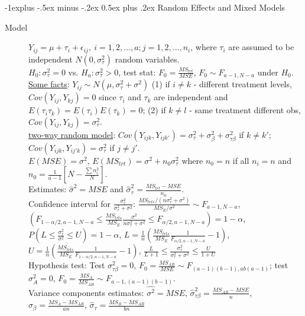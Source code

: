 \documentclass[10pt,landscape]{article}
\makeatletter
\renewcommand{\subsection}{\@startsection{subsection}{2}{0mm}%
                                {-1explus -.5ex minus -.2ex}%
                                {0.5ex plus .2ex}%
                                {\normalfont\normalsize\bfseries}}
\makeatother
\begin{document}
\begin{multicols}{3}
\subsection{Random Effects and Mixed Models}
\begin{description}
\item[Model] $Y_{ij} = \mu + \tau_i + \epsilon_{ij},\ i = 1,2,...,a; j = 1, 2,..., n_i$, where $\tau_i$  are assumed to be independent $N(0, \sigma_{\tau}^2)$ random variables. \\ 
$H_0: \sigma_{\tau}^2 = 0$ vs. $H_a: \sigma_{\tau}^2 > 0$, test stat: $F_0 = \frac{MS_{trt}}{MSE}$, $F_0 \sim F_{a-1,N-a}$ under $H_0$. \\
\underline{Some facts}: $Y_{ij} \sim N(\mu , \sigma_{\tau}^2+\sigma^2)$ (1) if $i\neq k$ - different treatment levels, $Cov(Y_{ij}, Y_{kj}) = 0$ since $\tau_i$ and $\tau_k$ are independent and $E(\tau_i\tau_k) = E(\tau_i)E(\tau_k) = 0$; (2) if $k \neq l$ - same treatment different obs, $Cov(Y_{ij}, Y_{kj}) = \sigma_{\tau}^2$. \\
\underline{two-way random model}: $Cov(Y_{ijk}, Y_{ijk'}) = \sigma_{\tau}^2 + \sigma_{\beta}^2 + \sigma_{\tau \beta}^2$ if $k \neq k'$; $Cov(Y_{ijk}, Y_{ij'k}) = \sigma_{\tau}^2$ if $j \neq j'$. \\
$E(MSE) = \sigma^2$, $E(MS_{trt}) = \sigma^2 + n_0\sigma_{\tau}^2$ where $n_0 = n$ if all $n_i = n$ and $n_0 = \frac{1}{a-1}[N-\frac{\sum n_i^2}{N}]$.\\
Estimates: $\hat{\sigma}^2 = MSE$ and $\hat{\sigma}_{\tau}^2 = \frac{MS_{trt} - MSE}{n_0}$.\\
Confidence interval for $\frac{\sigma_{\tau}^2}{\sigma_{\tau}^2 + \sigma^2}$: $\frac{MS_{trts} / (n\sigma_{\tau}^2 + \sigma^2)}{MS_E / \sigma^2} \sim F_{a-1,N-a}$, $(F_{1-\alpha/2, a-1, N-a} \leq \frac{MS_{trts}}{MS_E} \frac{\sigma^2}{n\sigma_{\tau}^2 + \sigma^2} \leq F_{\alpha /2, a-1, N-a}) = 1 - \alpha$, $P(L\leq \frac{\sigma_{\tau}^2}{\sigma^2} \leq U) = 1-\alpha$, $L = \frac{1}{n} (\frac{MS_{trts}}{MS_E} \frac{1}{F_{\alpha/2, a-1, N-a}} - 1)$, $U = \frac{1}{n} (\frac{MS_{trts}}{MS_E} \frac{1}{F_{1 - \alpha/2, a-1, N-a}} - 1)$, $\frac{L}{L+1} \leq \frac{\sigma_{\tau}^2}{\sigma_{\tau}^2 + \sigma^2} \leq \frac{U}{1+U}$\\
Hypothesis test: Test $\sigma_{\tau \beta}^2 = 0$, $F_0 = \frac{MS_{AB}}{MSE} \sim F_{(a-1)(b-1), ab(a-1)}$; test $\sigma_A^2 = 0$,  $F_0 = \frac{MS_A}{MS_{AB}} \sim F_{a-1, (a-1)(b-1)}$.\\
Variance components estimates: $\hat{\sigma^2} = MSE$, $\hat{\sigma}_{\tau \beta}^2 = \frac{MS_{AB} - MSE}{n}$, $\hat{\sigma}_{\beta} = \frac{MS_A - MS_{AB}}{an}$, $\hat{\sigma}_{\tau} = \frac{MS_B - MS_{AB}}{bn}$\\

\end{description}
\end{multicols}
\end{document}
